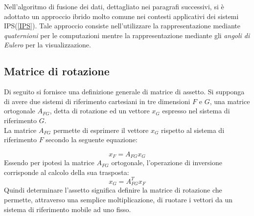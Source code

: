 Nell'algoritmo di fusione dei dati, dettagliato nei paragrafi successivi, si è adottato un approccio ibrido molto comune nei contesti applicativi dei sistemi IPS(\ref{IPS}). Tale approccio consiste nell'utilizzare la rappresentazione mediante \textit{quaternioni} per le computazioni mentre la rappresentazione mediante gli \textit{angoli di Eulero} per la visualizzazione.\\

\subsection{Matrice di rotazione}
Di seguito si fornisce una definizione generale di matrice di assetto\cite{assetto2}. Si supponga di avere due sistemi di riferimento cartesiani in tre dimensioni $F$ e $G$, una matrice ortogonale $A_{FG}$, detta di rotazione ed un vettore $x_G$ espresso nel sistema di riferimento $G$.\\
La matrice $A_{FG}$ permette di esprimere il vettore $x_G$ rispetto al sistema di riferimento $F$ secondo la seguente equazione:

\begin{equation}
x_F = A_{FG}x_G
\end{equation}
Essendo per ipotesi la matrice $A_{FG}$ ortogonale, l'operazione di inversione corrisponde al calcolo della sua trasposta:
 \begin{equation}
 x_G = A_{FG}^Tx_F
 \end{equation}
 Quindi determinare l'assetto significa definire la matrice di rotazione che permette, attraverso una semplice moltiplicazione, di ruotare i vettori da un sistema di riferimento mobile ad uno fisso.\\
 

